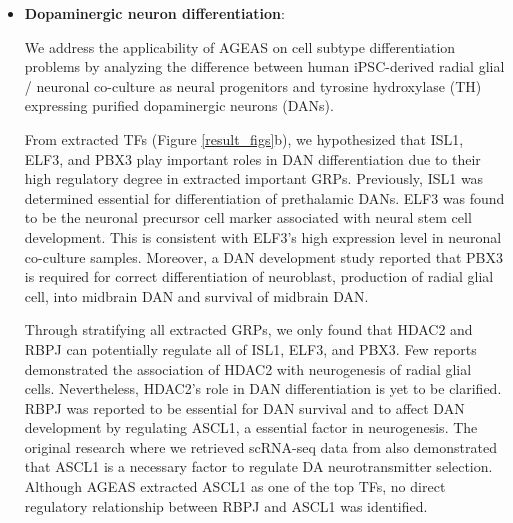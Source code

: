 \documentclass[fleqn,10pt]{wlscirep}
\begin{document}
  \begin{itemize}
      \setlength\itemsep{0em}
      \item {\textbf{Dopaminergic neuron differentiation}}:

        We address the applicability of AGEAS on cell subtype differentiation problems by analyzing the difference between human iPSC-derived radial glial / neuronal co-culture as neural progenitors\cite{ASCL1_dopaminergic_neuron_2021} and tyrosine hydroxylase (TH) expressing purified dopaminergic neurons (DANs).

        From extracted TFs (Figure \ref{result_figs}b), we hypothesized that ISL1, ELF3, and PBX3 play important roles in DAN differentiation due to their high regulatory degree in extracted important GRPs.
        Previously, ISL1 was determined essential for differentiation of prethalamic DANs. \cite{isl1_da}
        ELF3 was found to be the neuronal precursor cell marker associated with neural stem cell development. \cite{ELF3_precursor_marker}
        This is consistent with ELF3's high expression level in neuronal co-culture samples.
        Moreover, a DAN development study reported that PBX3 is required for correct differentiation of neuroblast, production of radial glial cell, into midbrain DAN and survival of midbrain DAN. \cite{pbx3_dan}

        Through stratifying all extracted GRPs, we only found that HDAC2 and RBPJ can potentially regulate all of ISL1, ELF3, and PBX3.
        Few reports demonstrated the association of HDAC2 with neurogenesis of radial glial cells. \cite{hdac2_dan_1, hdac2_dan_2}
        Nevertheless, HDAC2's role in DAN differentiation is yet to be clarified.
        RBPJ was reported to be essential for DAN survival and to affect DAN development by regulating ASCL1, a essential factor in neurogenesis. \cite{rbpj_1, rbpj_2}
        The original research where we retrieved scRNA-seq data from also demonstrated that ASCL1 is a necessary factor to regulate DA neurotransmitter selection. \cite{ASCL1_dopaminergic_neuron_2021}
        Although AGEAS extracted ASCL1 as one of the top TFs, no direct regulatory relationship between RBPJ and ASCL1 was identified.


\end{itemize}
\end{document}
